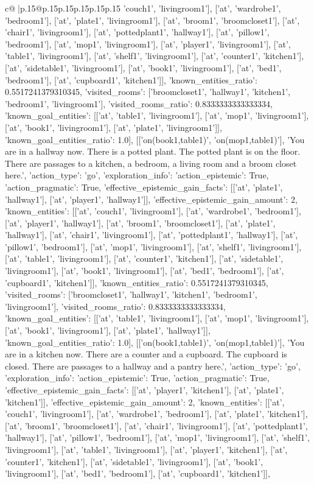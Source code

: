 \documentclass{article}
\begin{document}
{\begin{supertabular}{c@{$\;$}|p{.15\linewidth}@{}p{.15\linewidth}p{.15\linewidth}p{.15\linewidth}p{.15\linewidth}p{.15\linewidth}}
{{{'couch1', 'livingroom1'], ['at', 'wardrobe1', 'bedroom1'], ['at', 'plate1', 'livingroom1'], ['at', 'broom1', 'broomcloset1'], ['at', 'chair1', 'livingroom1'], ['at', 'pottedplant1', 'hallway1'], ['at', 'pillow1', 'bedroom1'], ['at', 'mop1', 'livingroom1'], ['at', 'player1', 'livingroom1'], ['at', 'table1', 'livingroom1'], ['at', 'shelf1', 'livingroom1'], ['at', 'counter1', 'kitchen1'], ['at', 'sidetable1', 'livingroom1'], ['at', 'book1', 'livingroom1'], ['at', 'bed1', 'bedroom1'], ['at', 'cupboard1', 'kitchen1']], 'known_entities_ratio': 0.5517241379310345, 'visited_rooms': ['broomcloset1', 'hallway1', 'kitchen1', 'bedroom1', 'livingroom1'], 'visited_rooms_ratio': 0.8333333333333334, 'known_goal_entities': [['at', 'table1', 'livingroom1'], ['at', 'mop1', 'livingroom1'], ['at', 'book1', 'livingroom1'], ['at', 'plate1', 'livingroom1']], 'known_goal_entities_ratio': 1.0}}], [['on(book1,table1)', 'on(mop1,table1)'], 'You are in a hallway now. There is a potted plant. The potted plant is on the floor. There are passages to a kitchen, a bedroom, a living room and a broom closet here.', {'action_type': 'go', 'exploration_info': {'action_epistemic': True, 'action_pragmatic': True, 'effective_epistemic_gain_facts': [['at', 'plate1', 'hallway1'], ['at', 'player1', 'hallway1']], 'effective_epistemic_gain_amount': 2, 'known_entities': [['at', 'couch1', 'livingroom1'], ['at', 'wardrobe1', 'bedroom1'], ['at', 'player1', 'hallway1'], ['at', 'broom1', 'broomcloset1'], ['at', 'plate1', 'hallway1'], ['at', 'chair1', 'livingroom1'], ['at', 'pottedplant1', 'hallway1'], ['at', 'pillow1', 'bedroom1'], ['at', 'mop1', 'livingroom1'], ['at', 'shelf1', 'livingroom1'], ['at', 'table1', 'livingroom1'], ['at', 'counter1', 'kitchen1'], ['at', 'sidetable1', 'livingroom1'], ['at', 'book1', 'livingroom1'], ['at', 'bed1', 'bedroom1'], ['at', 'cupboard1', 'kitchen1']], 'known_entities_ratio': 0.5517241379310345, 'visited_rooms': ['broomcloset1', 'hallway1', 'kitchen1', 'bedroom1', 'livingroom1'], 'visited_rooms_ratio': 0.8333333333333334, 'known_goal_entities': [['at', 'table1', 'livingroom1'], ['at', 'mop1', 'livingroom1'], ['at', 'book1', 'livingroom1'], ['at', 'plate1', 'hallway1']], 'known_goal_entities_ratio': 1.0}}], [['on(book1,table1)', 'on(mop1,table1)'], 'You are in a kitchen now. There are a counter and a cupboard. The cupboard is closed. There are passages to a hallway and a pantry here.', {'action_type': 'go', 'exploration_info': {'action_epistemic': True, 'action_pragmatic': True, 'effective_epistemic_gain_facts': [['at', 'player1', 'kitchen1'], ['at', 'plate1', 'kitchen1']], 'effective_epistemic_gain_amount': 2, 'known_entities': [['at', 'couch1', 'livingroom1'], ['at', 'wardrobe1', 'bedroom1'], ['at', 'plate1', 'kitchen1'], ['at', 'broom1', 'broomcloset1'], ['at', 'chair1', 'livingroom1'], ['at', 'pottedplant1', 'hallway1'], ['at', 'pillow1', 'bedroom1'], ['at', 'mop1', 'livingroom1'], ['at', 'shelf1', 'livingroom1'], ['at', 'table1', 'livingroom1'], ['at', 'player1', 'kitchen1'], ['at', 'counter1', 'kitchen1'], ['at', 'sidetable1', 'livingroom1'], ['at', 'book1', 'livingroom1'], ['at', 'bed1', 'bedroom1'], ['at', 'cupboard1', 'kitchen1']], }}}
\end{supertabular}}
\end{document}
